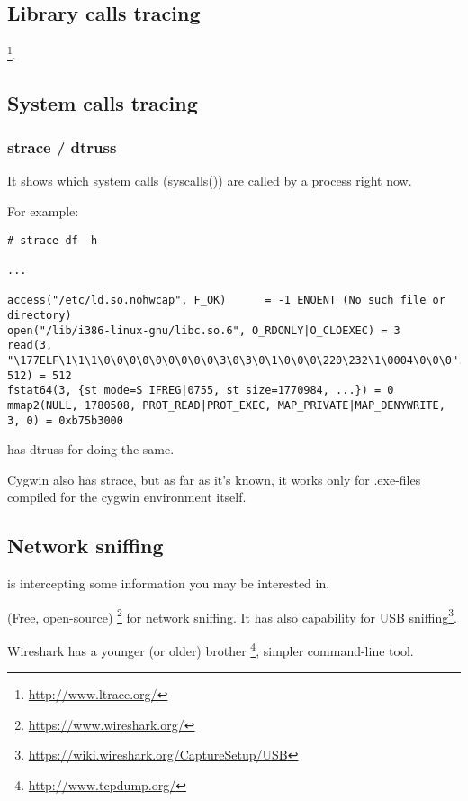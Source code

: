 \subsection{Library calls tracing}

\footnote{\url{http://www.ltrace.org/}}.

\subsection{System calls tracing}

\label{strace}
\subsubsection{strace / dtruss}

It shows which system calls (syscalls()) are called by a process right now.

For example:

\begin{lstlisting}
# strace df -h

...

access("/etc/ld.so.nohwcap", F_OK)      = -1 ENOENT (No such file or directory)
open("/lib/i386-linux-gnu/libc.so.6", O_RDONLY|O_CLOEXEC) = 3
read(3, "\177ELF\1\1\1\0\0\0\0\0\0\0\0\0\3\0\3\0\1\0\0\0\220\232\1\0004\0\0\0"..., 512) = 512
fstat64(3, {st_mode=S_IFREG|0755, st_size=1770984, ...}) = 0
mmap2(NULL, 1780508, PROT_READ|PROT_EXEC, MAP_PRIVATE|MAP_DENYWRITE, 3, 0) = 0xb75b3000
\end{lstlisting}

\myindex{\MacOSX}
\MacOSX has dtruss for doing the same.

Cygwin also has strace, but as far as it's known, it works only for .exe-files
compiled for the cygwin environment itself.

\subsection{Network sniffing}

 is intercepting some information you may be interested in.

(Free, open-source) \footnote{\url{https://www.wireshark.org/}} for network sniffing.
It has also capability for USB sniffing\footnote{\url{https://wiki.wireshark.org/CaptureSetup/USB}}.

Wireshark has a younger (or older) brother \footnote{\url{http://www.tcpdump.org/}}, simpler command-line tool.

